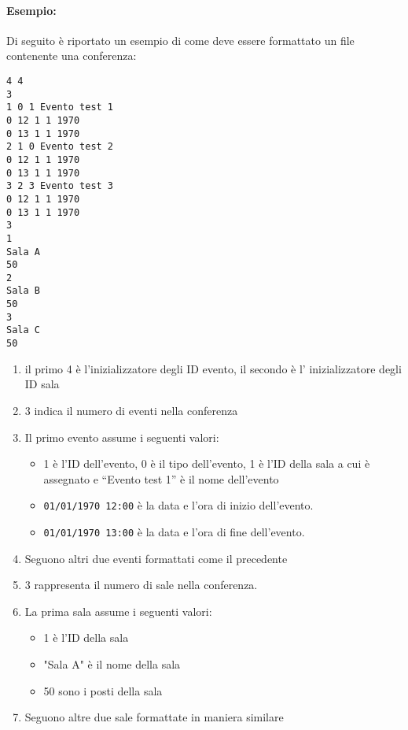 \documentclass[11pt]{scrartcl} %
\begin{document}
\begin{minipage}{\linewidth}
\paragraph{Esempio:}
Di seguito è riportato un esempio di come deve essere formattato un file contenente una conferenza:

\begin{lstlisting}
4 4
3
1 0 1 Evento test 1
0 12 1 1 1970
0 13 1 1 1970
2 1 0 Evento test 2
0 12 1 1 1970
0 13 1 1 1970
3 2 3 Evento test 3
0 12 1 1 1970
0 13 1 1 1970
3
1
Sala A
50
2
Sala B
50
3
Sala C
50
\end{lstlisting}

\begin{enumerate}
    \item il primo 4 è l'inizializzatore degli ID evento, il secondo è l' inizializzatore degli ID sala
    \item 3 indica il numero di eventi nella conferenza
    \item Il primo evento assume i seguenti valori:
    \begin{itemize}
        \item 1 è l'ID dell'evento, 0 è il tipo dell'evento, 1 è l'ID della sala a cui è assegnato e ``Evento test 1'' è il nome dell'evento
				\item \texttt{01/01/1970 12:00} è la data e l'ora di inizio dell'evento.
				\item \texttt{01/01/1970 13:00} è la data e l'ora di fine dell'evento.
    \end{itemize}
    \item Seguono altri due eventi formattati come il precedente
    \item 3 rappresenta il numero di sale nella conferenza.
    \item La prima sala assume i seguenti valori:
    \begin{itemize}
				\item 1 è l'ID della sala
        \item "Sala A" è il nome della sala
        \item 50 sono i posti della sala
    \end{itemize}
    \item Seguono altre due sale formattate in maniera similare
\end{enumerate}

\end{minipage}
\end{document}
